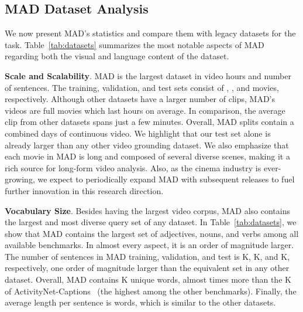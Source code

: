 \documentclass[10pt,twocolumn,letterpaper]{article}
\renewcommand{\paragraph}[1]{\vspace{1mm}\noindent\textbf{#1}.}
\begin{document}
\subsection{MAD Dataset Analysis} 
We now present MAD's statistics and compare them with legacy datasets for the task. Table~\ref{tab:datasets} summarizes the most notable aspects of MAD regarding both the visual and language content of the dataset. 

\paragraph{Scale and Scalability} MAD is the largest dataset in video hours and number of sentences. The training, validation, and test sets consist of , , and  movies, respectively.  Although other datasets have a larger number of clips, MAD's videos are full movies which last  hours on average. In comparison, the average clip from other datasets spans just a few minutes. Overall, MAD splits contain a combined  days of continuous video. We highlight that our test set alone is already larger than any other video grounding dataset. We also emphasize that each movie in MAD is long and composed of several diverse scenes, making it a rich source for long-form video analysis. Also, as the cinema industry is ever-growing, we expect to periodically expand MAD with subsequent releases to fuel further innovation in this research direction. 

\paragraph{Vocabulary Size} Besides having the largest video corpus, MAD also contains the largest and most diverse query set of any dataset. In Table~\ref{tab:datasets}, we show that MAD contains the largest set of adjectives, nouns, and verbs among all available benchmarks. In almost every aspect, it is an order of magnitude larger. The number of sentences in MAD training, validation, and test is K, K, and K, respectively, one order of magnitude larger than the equivalent set in any other dataset. Overall, MAD contains K unique words, almost  times more than the K of ActivityNet-Captions~\cite{Krishna_2017_ICCV} (the highest among the other benchmarks). Finally, the average length per sentence is  words, which is similar to the other datasets.
\end{document}
